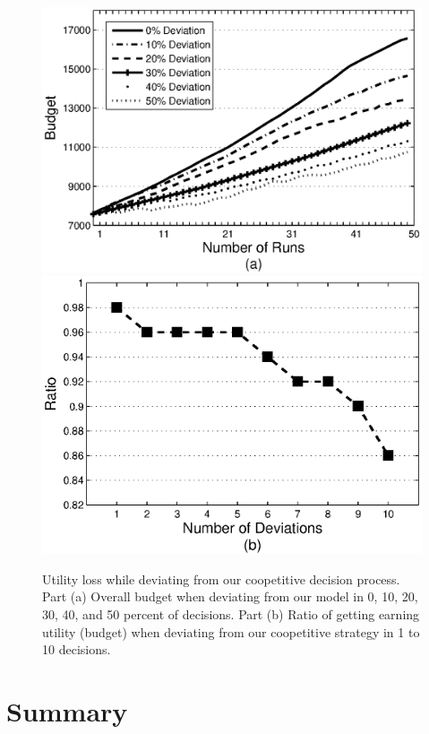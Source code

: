 \begin{figure}%
\includegraphics[scale=0.47]{Figures/graphdev.eps}
\includegraphics[scale=0.47]{Figures/graphdev2.eps}
\caption{Utility loss while deviating from our coopetitive
decision process. Part (a) Overall budget when deviating from our
model in 0, 10, 20, 30, 40, and 50 percent of decisions. Part (b)
Ratio of getting earning utility (budget) when deviating from our
coopetitive strategy in 1 to 10 decisions.} \label{graph_dev}
\end{figure}

\section{Summary}\label{sec:conclusion-cha3}

